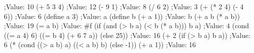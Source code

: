 \begtt{}
;Value: 10
(+ 5 3 4)
;Value: 12
(- 9 1)
;Value: 8
(/ 6 2)
;Value: 3
(+ (* 2 4) (- 4 6))
;Value: 6
(define a 3)
;Value: a
(define b (+ a 1))
;Value: b
(+ a b (* a b))
;Value: 19
(= a b)
;Value: #f
(if (and (> b a) (< b (* a b)))
    b
    a)
;Value: 4
(cond ((= a 4) 6)
      ((= b 4) (+ 6 7 a))
      (else 25))
;Value: 16
(+ 2 (if (> b a) b a))
;Value: 6
(* (cond ((> a b) a)
         ((< a b) b)
         (else -1))
   (+ a 1))
;Value: 16
\endtt
